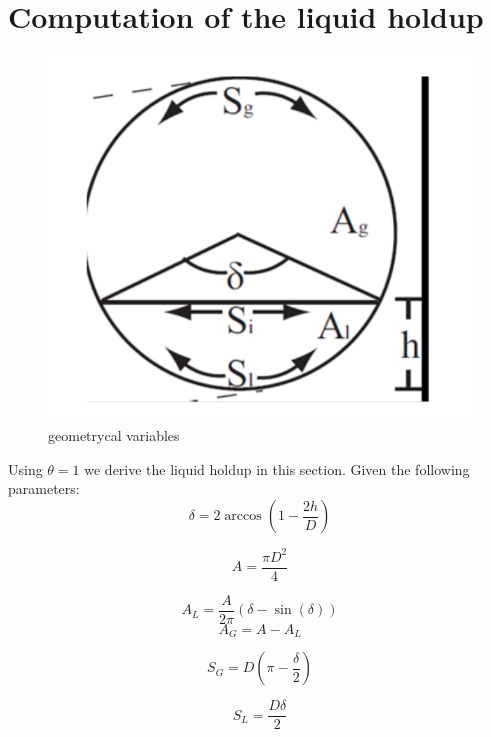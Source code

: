 \documentclass[10pt,a4paper]{report}
\begin{document}
\section{Computation of the liquid holdup}
\begin{figure}[H]
\centering
\includegraphics[scale=0.5]{h.png}
\caption{geometrycal variables}\label{visina8}
\end{figure}

Using $\theta = 1$ we derive the liquid holdup in this section. Given the following parameters:
\begin{equation}
\delta = 2\arccos\left(1-\frac{2h}{D} \right) \nonumber
\end{equation}

\begin{equation}
A = \frac{\pi D^{2}}{4}\nonumber
\end{equation}

\begin{equation}\label{al}
A_{L} = \frac{A}{2\pi}(\delta-\sin(\delta)) 
\end{equation}
\begin{equation}
A_{G} = A-A_{L} \nonumber
\end{equation}

\begin{equation}
S_{G} = D\left( \pi-\frac{\delta}{2}  \right) \nonumber
\end{equation}

\begin{equation}
S_{L} = \frac{D\delta}{2} \nonumber
\end{equation}
\end{document}
